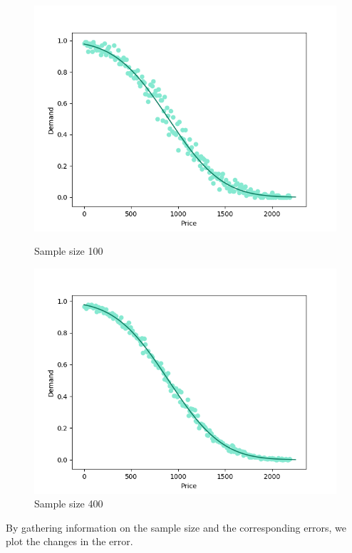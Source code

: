 \documentclass[11pt, a4paper]{article}
\theoremstyle{definition}
\begin{document}
		\begin{figure}[H]
			\begin{minipage}{0.48\textwidth}
				\centering
				\includegraphics[width=\linewidth]{Exp_and_math_100}
				\caption{Sample size 100}\label{Fig:Data3}
			\end{minipage}\hfill
			\begin{minipage}{0.48\textwidth}
				\centering
				\includegraphics[width=\linewidth]{Exp_and_math_400}
				\caption{Sample size 400}\label{Fig:Data4}
			\end{minipage}
		\end{figure}\par\noindent
		By gathering information on the sample size and the corresponding errors, we plot the changes in the error.
\end{document}
